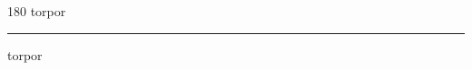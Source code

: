 
\begin{frame}
\begin{center}
\begin{turn}{180}
{\fontsize{2.5cm}{1em}\selectfont torpor}
\end{turn}
\vspace{1em}\par  
\hrule
\vspace{1em}\par  
{\fontsize{2.5cm}{1em}\selectfont torpor}
\end{center}
\end{frame}

